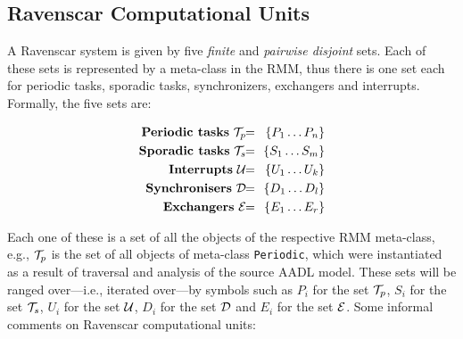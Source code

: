%


\subsection{Ravenscar Computational Units}
A Ravenscar system is given by five \emph{finite} and \emph{pairwise
  disjoint} sets. Each of these sets is represented by a meta-class in
the RMM, thus there is one set each for periodic tasks, sporadic
tasks, synchronizers, exchangers and interrupts. Formally, the five
sets are:

\begin{eqnarray}
  \nonumber
  \text{\textbf{Periodic tasks}} \ {\cal T}_p \!& \!= \!&\! \{P_1 \ldots P_n\}\\
  \nonumber
  \text{\textbf{Sporadic tasks}} \  {\cal T}_s  \! & \!= \! & \!  \{S_1  \ldots S_m\} \\
  \nonumber
  \text{\textbf{Interrupts}} \   {\cal U} \! & \!= \! & \! \{U_1  \ldots U_k\}  \\ 
  \nonumber
  \text{\textbf{Synchronisers}} \    {\cal D} \! & \!= \! & \! \{D_1 \ldots D_l\} \\  
  \nonumber
  \text{\textbf{Exchangers}} \  {\cal E} \! & \!= \! & \! \{E_1  \ldots E_r\} 
\end{eqnarray}

Each one of these is a set of all the objects of the respective RMM
meta-class, e.g., ${\cal T}_p$ is the set of all objects of meta-class
\texttt{Periodic}, which were instantiated as a result of traversal
and analysis of the source AADL model. These sets will be ranged
over---i.e., iterated over---by symbols such as $P_i$ for the set
${\cal T}_p$, $S_i$ for the set ${\cal T}_s$, $U_i$ for the set ${\cal
  U}$, $D_i$ for the set ${\cal D}$ and $E_i$ for the set ${\cal
  E}$. Some informal comments on Ravenscar computational units:


